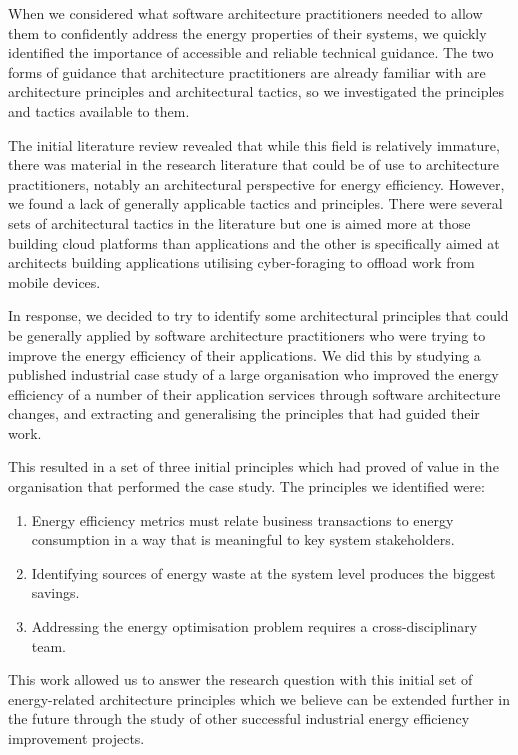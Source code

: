 When we considered what software architecture practitioners needed to allow them to confidently address the energy properties of their systems, we quickly identified the importance of accessible and reliable technical guidance.  The two forms of guidance that architecture practitioners are already familiar with are architecture principles and architectural tactics, so we investigated the principles and tactics available to them.

The initial literature review revealed that while this field is relatively immature, there was material in the research literature that could be of use to architecture practitioners, notably an architectural perspective for energy efficiency. However, we found a lack of generally applicable tactics and principles.  There were several sets of architectural tactics in the literature \cite{lewis2015-foragingtactics,procaccianti2013-cloudenergyefficiency} but one is aimed more at those building cloud platforms than applications and the other is specifically aimed at architects building applications utilising cyber-foraging to offload work from mobile devices.

In response, we decided to try to identify some architectural principles that could be generally applied by software architecture practitioners who were trying to improve the energy efficiency of their applications.  We did this by studying a published industrial case study of a large organisation who improved the energy efficiency of a number of their application services through software architecture changes, and extracting and generalising the principles that had guided their work.

This resulted in a set of three initial principles which had proved of value in the organisation that performed the case study.  The principles we identified were:
\begin{enumerate}
	\item Energy efficiency metrics must relate business transactions to energy consumption in a way that is meaningful to key system stakeholders.
	\item Identifying sources of energy waste at the system level produces the biggest savings.
	\item Addressing the energy optimisation problem requires a cross-disciplinary team.
\end{enumerate}

This work allowed us to answer the research question with this initial set of energy-related architecture principles which we believe can be extended further in the future through the study of other successful industrial energy efficiency improvement projects.

